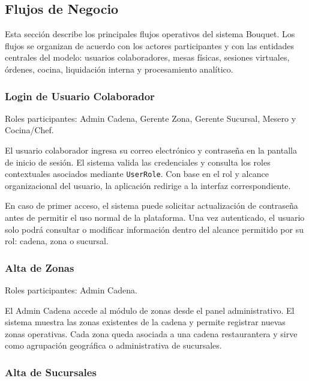 \subsection{Flujos de Negocio}

Esta sección describe los principales flujos operativos del sistema Bouquet. Los
flujos se organizan de acuerdo con los actores participantes y con las entidades
centrales del modelo: usuarios colaboradores, mesas físicas, sesiones virtuales,
órdenes, cocina, liquidación interna y procesamiento analítico.

\subsubsection{Login de Usuario Colaborador}

Roles participantes: Admin Cadena, Gerente Zona, Gerente Sucursal, Mesero y
Cocina/Chef.

El usuario colaborador ingresa su correo electrónico y contraseña en la pantalla
de inicio de sesión. El sistema valida las credenciales y consulta los roles
contextuales asociados mediante \texttt{UserRole}. Con base en el rol y alcance
organizacional del usuario, la aplicación redirige a la interfaz correspondiente.

En caso de primer acceso, el sistema puede solicitar actualización de contraseña
antes de permitir el uso normal de la plataforma. Una vez autenticado, el usuario
solo podrá consultar o modificar información dentro del alcance permitido por su
rol: cadena, zona o sucursal.

\subsubsection{Alta de Zonas}

Roles participantes: Admin Cadena.

El Admin Cadena accede al módulo de zonas desde el panel administrativo. El sistema
muestra las zonas existentes de la cadena y permite registrar nuevas zonas operativas.
Cada zona queda asociada a una cadena restaurantera y sirve como agrupación geográfica
o administrativa de sucursales.

\subsubsection{Alta de Sucursales}

